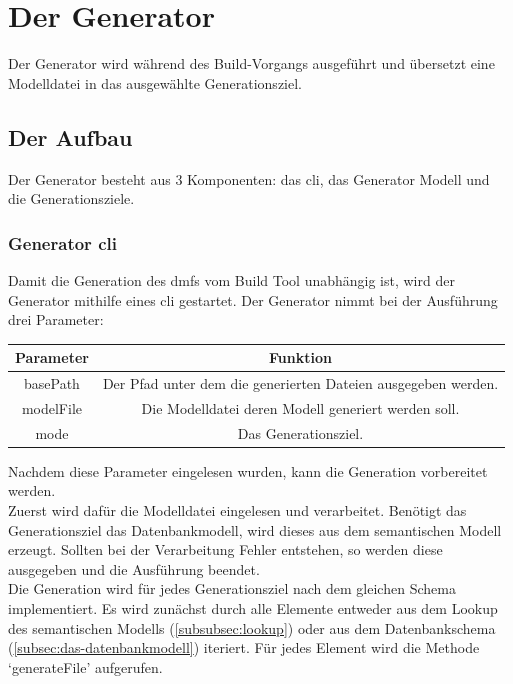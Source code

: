 \documentclass[./einleitung.tex]{subfiles}
\begin{document}
    \section{Der Generator}\label{sec:der-generator}
    Der Generator wird während des Build-Vorgangs ausgeführt und übersetzt eine Modelldatei in das ausgewählte Generationsziel.
    \subsection{Der Aufbau}
    Der Generator besteht aus 3 Komponenten: das \acrfull{cli}, das Generator Modell und die Generationsziele.
    \subsubsection{Generator \acrshort{cli}}\label{subsubsec:generator-cli}
    Damit die Generation des \acrshort{dmf}s vom Build Tool unabhängig ist, wird der Generator mithilfe eines \acrshort{cli} gestartet.
    Der Generator nimmt bei der Ausführung drei Parameter:
    \begin{center}
        \begin{tabular}{|c|c|}
            \hline
            Parameter & Funktion\\
            \hline\hline
            basePath & Der Pfad unter dem die generierten Dateien ausgegeben werden.\\
            \hline
            modelFile & Die Modelldatei deren Modell generiert werden soll.\\
            \hline
            mode & Das Generationsziel.\\
            \hline
        \end{tabular}
    \end{center}
    Nachdem diese Parameter eingelesen wurden, kann die Generation vorbereitet werden.\\
    Zuerst wird dafür die Modelldatei eingelesen und verarbeitet.
    Benötigt das Generationsziel das Datenbankmodell, wird dieses aus dem semantischen Modell erzeugt.
    Sollten bei der Verarbeitung Fehler entstehen, so werden diese ausgegeben und die Ausführung beendet.\\
    Die Generation wird für jedes Generationsziel nach dem gleichen Schema implementiert.
    Es wird zunächst durch alle Elemente entweder aus dem Lookup des semantischen Modells (\ref{subsubsec:lookup}) oder aus dem Datenbankschema (\ref{subsec:das-datenbankmodell}) iteriert.
    Für jedes Element wird die Methode `generateFile' aufgerufen.
\end{document}
